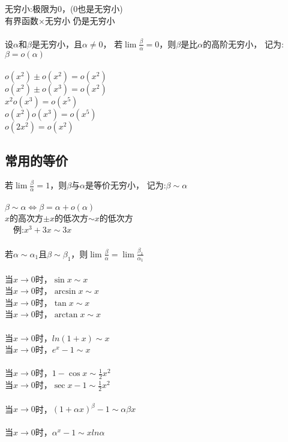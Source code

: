 \documentclass{article}
\begin{document}
\begin{flushleft}
	无穷小:极限为0，(0也是无穷小)\\
	有界函数$\times$无穷小 仍是无穷小\\
	~\\
	设$\alpha$和$\beta$是无穷小，且$\alpha \neq 0$，
	若$\lim \frac{\beta}{\alpha}=0$，则$\beta$是比$\alpha$的高阶无穷小，
	记为:$\beta = o(\alpha)$\\
	~\\
	$o(x^2)\pm o(x^2)=o(x^2)$\\
	$o(x^2)\pm o(x^3)=o(x^2)$\\
	$x^2 o(x^3)=o(x^5)$\\
	$o(x^2) o(x^3)=o(x^5)$\\
	$o(2x^2)=o(x^2)$\\
	
	\subsection{常用的等价}
	
	若$\lim \frac{\beta}{\alpha}=1$，则$\beta$与$\alpha$是等价无穷小，
	记为:$\beta \sim \alpha$\\
	~\\
	$\beta \sim \alpha \Leftrightarrow \beta = \alpha + o(\alpha)$\\
	$x$的高次方$\pm x$的低次方$\sim x$的低次方\\
	\ \ 例:$x^3+3x\sim 3x$\\
	~\\
	若$\alpha \sim \alpha_1$且$\beta \sim \beta_1$，则$\lim \frac{\beta}{\alpha} = \lim \frac{\beta_1}{\alpha_1}$\\
	~\\
	当$x\to 0$时，$\sin x \sim x$\\
	当$x\to 0$时，$\arcsin x \sim x$\\
	当$x\to 0$时，$\tan x \sim x$\\
	当$x\to 0$时，$\arctan x \sim x$\\
	~\\
	当$x\to 0$时，$ln(1+x) \sim x$\\
	当$x\to 0$时，$e^x-1 \sim x$\\
	~\\
	当$x\to 0$时，$1-\cos x \sim \frac{1}{2} x^2$\\
	当$x\to 0$时，$\sec x - 1 \sim \frac{1}{2} x^2$\\
	~\\
	当$x\to 0$时，$(1+\alpha x)^\beta -1 \sim \alpha\beta x$\\
	~\\
	当$x\to 0$时，$\alpha^x -1 \sim xln\alpha$\\
	

\end{flushleft}
\end{document}
